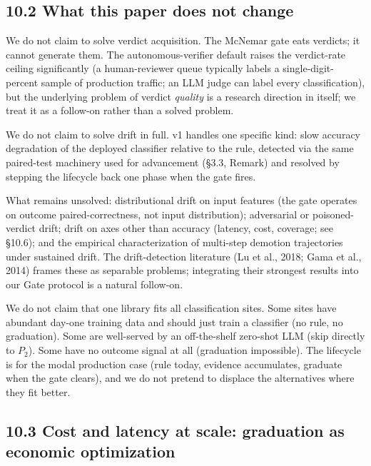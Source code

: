 \subsection{10.2 What this paper does not
change}\label{what-this-paper-does-not-change}

We do not claim to solve verdict acquisition. The McNemar gate eats
verdicts; it cannot generate them. The autonomous-verifier default
raises the verdict-rate ceiling significantly (a human-reviewer queue
typically labels a single-digit-percent sample of production traffic; an
LLM judge can label every classification), but the underlying problem of
verdict \emph{quality} is a research direction in itself; we treat it as
a follow-on rather than a solved problem.

We do not claim to solve drift in full. v1 handles one specific kind:
slow accuracy degradation of the deployed classifier relative to the
rule, detected via the same paired-test machinery used for advancement
(§3.3, Remark) and resolved by stepping the lifecycle back one phase
when the gate fires.

What remains unsolved: distributional drift on input features (the gate
operates on outcome paired-correctness, not input distribution);
adversarial or poisoned-verdict drift; drift on axes other than accuracy
(latency, cost, coverage; see §10.6); and the empirical characterization
of multi-step demotion trajectories under sustained drift. The
drift-detection literature (Lu et al., 2018; Gama et al., 2014) frames
these as separable problems; integrating their strongest results into
our Gate protocol is a natural follow-on.

We do not claim that one library fits all classification sites. Some
sites have abundant day-one training data and should just train a
classifier (no rule, no graduation). Some are well-served by an
off-the-shelf zero-shot LLM (skip directly to \(P_2\)). Some have no
outcome signal at all (graduation impossible). The lifecycle is for the
modal production case (rule today, evidence accumulates, graduate when
the gate clears), and we do not pretend to displace the alternatives
where they fit better.

\subsection{10.3 Cost and latency at scale: graduation as economic
optimization}\label{cost-and-latency-at-scale-graduation-as-economic-optimization}

